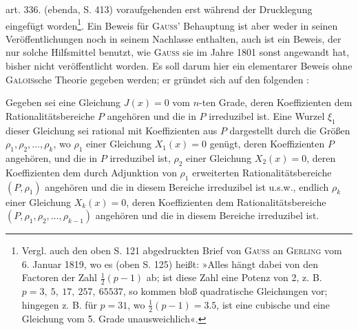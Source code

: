 \clearpage{}
\par\begingroup\small
\renewcommand{\thefootnote}{*)}
\noindent art. 336. (ebenda, S. 413) voraufgehenden erst während der Drucklegung eingefügt worden\footnote{Vergl. auch den oben S. 121 abgedruckten Brief von \textsc{Gauss} an \textsc{Gerling} vom 6. Januar 1819, wo es (oben S. 125) heißt: »Alles hängt dabei von den Factoren der Zahl \(\frac12(p-1)\) ab; ist diese Zahl eine Potenz von 2, z. B. \(p=3,\ 5,\ 17,\ 257,\ 65537\), so kommen bloß quadratische Gleichungen vor; hingegen z. B. für \(p=31\), wo \(\frac12(p-1)=3\mathord{.}5\), ist eine cubische und eine Gleichung vom 5. Grade unausweichlich«.}. Ein Beweis für \textsc{Gauss}' Behauptung ist aber weder in seinen Veröffentlichungen noch in seinem Nachlasse enthalten, auch ist ein Beweis, der nur solche Hilfsmittel benutzt, wie \textsc{Gauss} sie im Jahre 1801 sonst angewandt hat, bisher nicht veröffentlicht worden. Es soll darum hier ein elementarer Beweis ohne \textsc{Galois}sche Theorie gegeben werden; er gründet sich auf den folgenden :
\par\noindent\hspace*{\parindent}Gegeben sei eine Gleichung \(J(x)=0\) vom \(n\)-ten Grade, deren Koeffizienten dem Rationalitätsbereiche \(P\) angehören und die in \(P\) irreduzibel ist. Eine Wurzel \(\xi_1\) dieser Gleichung sei rational mit Koeffizienten aus \(P\) dargestellt durch die Größen \(\rho_1,\rho_2,\ldots,\rho_k\), wo \(\rho_1\) einer Gleichung \(X_1(x)=0\) genügt, deren Koeffizienten \(P\) angehören, und die in \(P\) irreduzibel ist, \(\rho_2\) einer Gleichung \(X_2(x)=0\), deren Koeffizienten dem durch Adjunktion von \(\rho_1\) erweiterten Rationalitätsbereiche \((P,\rho_1)\) angehören und die in diesem Bereiche irreduzibel ist u.s.w., endlich \(\rho_k\) einer Gleichung \(X_k(x)=0\), deren Koeffizienten dem Rationalitätsbereiche \((P,\rho_1,\rho_2,\ldots,\rho_{k-1})\) angehören und die in diesem Bereiche irreduzibel ist. 
